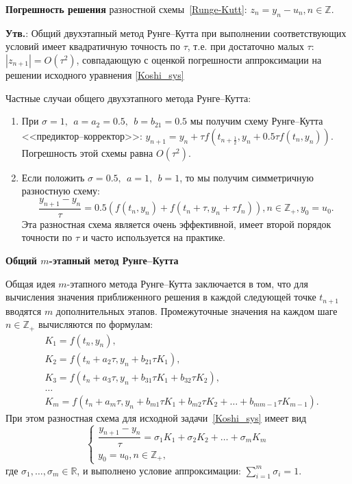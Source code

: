 \textbf{Погрешность решения} разностной схемы~\eqref{Runge-Kutt}: $z_n = y_n - u_n,  n\in\mathbb{Z}.$

\textbf{Утв.}: Общий двухэтапный метод Рунге--Кутта
при выполнении соответствующих условий
имеет квадратичную точность по $\tau$, т.е. при достаточно малых $\tau$: $|z_{n+1}| = O(\tau^2)$, совпадающую с оценкой погрешности аппроксимации на решении исходного уравнения \eqref{Koshi_sys}

Частные случаи общего двухэтапного метода Рунге--Кутта:

\begin{enumerate}
%
    \item При $\sigma=1,~~a=a_2=0.5,~~b=b_{21}=0.5$ мы получим схему Рунге--Кутта <<предиктор--корректор>>:
    $y_{n+1} = y_n + \tau f(t_{n+\frac12}, y_n + 0.5\tau f(t_n, y_n)).$
    Погрешность этой схемы равна $O(\tau^2)$.

    \item Если положить $\sigma=0.5,~~a=1,~~b=1$, то мы получим симметричную разностную схему:
    $$\dfrac{y_{n+1} - y_n}{\tau} = 0.5 \left(f(t_n, y_n) +
      f(t_n + \tau, y_n + \tau f_n)\right), n\in\mathbb{Z}_+, y_0 = u_0.
    $$
    Эта разностная схема является очень эффективной, имеет второй
    порядок точности по $\tau$ и часто используется на практике.
\end{enumerate}




\centerline{\textbf{Общий $m$-этапный метод Рунге--Кутта}}

Общая идея $m$-этапного метода Рунге--Кутта заключается в том, что
для вычисления значения приближенного решения в каждой следующей точке $t_{n+1}$
вводятся $m$ дополнительных этапов.
Промежуточные значения на каждом шаге $n\in\mathbb{Z}_+$ вычисляются по формулам:
$$
\begin{aligned}
%
    &K_1 = f(t_n, y_n), \\
    &K_2 = f(t_n + a_2\tau, y_n + b_{21} \tau K_1), \\
    &K_3 = f(t_n + a_3\tau, y_n + b_{31}\tau K_1 + b_{32}\tau K_2), \\
    &\dots \\
    &K_m = f(t_n+a_m\tau, y_n + b_{m1} \tau K_1 + b_{m2} \tau K_2 + \ldots + b_{m m -1} \tau K_{m-1}).
%
\end{aligned}
$$
%
При этом разностная схема для исходной задачи~\eqref{Koshi_sys}
имеет вид
%
\begin{equation}
    \label{gen_Runge-Kutt_meth}
    \begin{cases}
        \dfrac{y_{n+1} - y_n}{\tau} = \sigma_1 K_1 + \sigma_2 K_2 + \ldots + \sigma_m K_m \\
        y_0 = u_0, n \in \mathbb{Z}_+,
    \end{cases}
\end{equation}
%
где $\sigma_1, \ldots, \sigma_m \in\mathbb{R}$, и выполнено условие аппроксимации: $\sum\limits_{i=1}^{m} \sigma_i = 1.$


